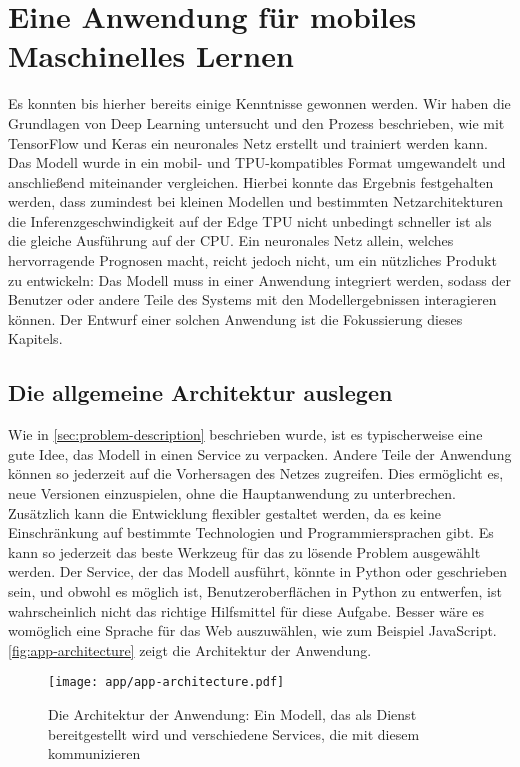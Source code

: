 \chapter{Eine Anwendung für mobiles Maschinelles Lernen}
\label{chap:application}
Es konnten bis hierher bereits einige Kenntnisse gewonnen
werden. Wir haben die Grundlagen von Deep Learning untersucht
und den Prozess beschrieben, wie mit TensorFlow und Keras
ein neuronales Netz erstellt und trainiert werden kann.
Das Modell wurde in ein mobil- und TPU-kompatibles Format umgewandelt
und anschließend miteinander vergleichen.
Hierbei konnte das Ergebnis festgehalten werden,
dass zumindest bei kleinen Modellen und bestimmten Netzarchitekturen
die Inferenzgeschwindigkeit
auf der Edge TPU nicht unbedingt schneller ist als die gleiche Ausführung auf der CPU.
Ein neuronales Netz allein, welches hervorragende Prognosen
macht, reicht jedoch nicht, um ein nützliches Produkt zu entwickeln:
Das Modell muss in einer Anwendung integriert werden, sodass
der Benutzer oder andere Teile des Systems
mit den Modellergebnissen interagieren können.
Der Entwurf einer solchen Anwendung ist die
Fokussierung dieses Kapitels.

\section{Die allgemeine Architektur auslegen}
Wie in \autoref{sec:problem-description} beschrieben wurde, ist es
typischerweise eine gute Idee, das Modell in einen Service zu verpacken.
Andere Teile der Anwendung können so jederzeit auf die Vorhersagen
des Netzes zugreifen. Dies ermöglicht es, neue Versionen
einzuspielen, ohne die Hauptanwendung zu unterbrechen.
Zusätzlich kann die Entwicklung flexibler gestaltet werden,
da es keine Einschränkung auf bestimmte Technologien
und Programmiersprachen gibt. Es kann so jederzeit das
beste Werkzeug für das zu lösende Problem ausgewählt werden.
Der Service, der das Modell ausführt, könnte in Python oder \cpp{}
geschrieben sein, und obwohl es möglich ist, Benutzeroberflächen 
in Python zu entwerfen, ist \cpp{} wahrscheinlich nicht das
richtige Hilfsmittel für diese Aufgabe.
Besser wäre es womöglich eine Sprache für das Web auszuwählen, 
wie zum Beispiel JavaScript.
\autoref{fig:app-architecture} zeigt die Architektur der Anwendung.
\begin{figure}[h!]
  \centering
  \texttt{[image: app/app-architecture.pdf]}
  \caption{Die Architektur der Anwendung: Ein Modell, das als Dienst
  bereitgestellt wird und verschiedene Services, die mit diesem kommunizieren}
  \label{fig:app-architecture}
\end{figure}

